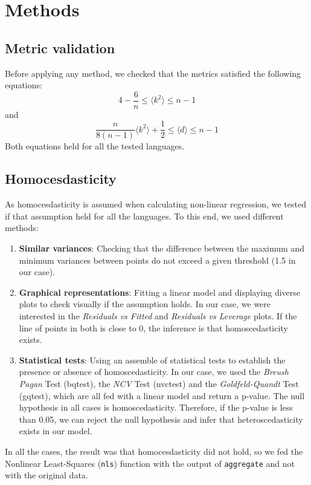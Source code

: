 \documentclass{article}
\begin{document}
\newpage

\section{Methods}
\subsection{Metric validation}
Before applying any method, we checked that the metrics satisfied the following equations:
\[
4 - \frac{6}{n} \leq \langle k^2 \rangle \leq n-1
\]
and
\[
\frac{n}{8(n-1)} \langle k^2 \rangle + \frac{1}{2} \leq \langle d \rangle \leq n-1
\]
Both equations held for all the tested languages.

\subsection{Homocesdasticity}
As homocesdasticity is assumed when calculating non-linear regression, we tested if that assumption held for all the languages. To this end, we used different methods:
\begin{enumerate}
    \item \textbf{Similar variances}: Checking that the difference between the maximum and minimum variances between points do not exceed a given threshold (1.5 in our case).
    \item \textbf{Graphical representations}: Fitting a linear model and displaying diverse plots to check visually if the assumption holds. In our case, we were interested in the \emph{Residuals vs Fitted} and \emph{Residuals vs Leverage} plots. If the line of points in both is close to 0, the inference is that homoscedasticity exists.
    \item \textbf{Statistical tests}: Using an assemble of statistical tests to establish the presence or absence of homoscedasticity. In our case, we used the \emph{Breush Pagan} Test (bqtest), the \emph{NCV} Test (nvctest) and the \emph{Goldfeld-Quandt} Test (gqtest), which are all fed with a linear model and return a p-value. The null hypothesis in all cases is homoscedasticity. Therefore, if the p-value is less than 0.05, we can reject the null hypothesis and infer that heteroscedasticity exists in our model.
\end{enumerate}

In all the cases, the result was that homocesdasticity did not hold, so we fed the Nonlinear Least-Squares (\texttt{nls}) function with the output of \texttt{aggregate} and not with the original data.
\end{document}
